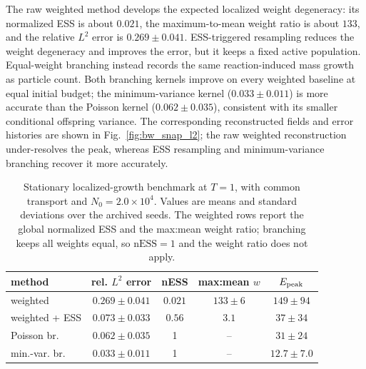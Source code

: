 \documentclass[a4paper,fleqn]{cas-sc}
\theoremstyle{definition}
\theoremstyle{remark}
\begin{document}
The raw weighted method develops the expected localized weight degeneracy: its normalized
ESS is about \(0.021\), the maximum-to-mean weight ratio is about \(133\), and the relative
\(L^2\) error is \(0.269\pm0.041\).  ESS-triggered resampling reduces the weight degeneracy
and improves the error, but it keeps a fixed active population.  Equal-weight branching
instead records the same reaction-induced mass growth as particle count.  Both branching
kernels improve on every weighted baseline at equal initial budget; the minimum-variance
kernel (\(0.033\pm0.011\)) is more accurate than the Poisson kernel (\(0.062\pm0.035\)),
consistent with its smaller conditional offspring variance.
The corresponding reconstructed
fields and error histories are shown in Fig.~\ref{fig:bw_snap_l2}; the raw weighted
reconstruction under-resolves the peak, whereas ESS resampling and minimum-variance
branching recover it more accurately.
\begin{table}[t]
\centering
\small
\caption{Stationary localized-growth benchmark at \(T=1\), with common transport and
\(N_0=2.0\times10^4\).  Values are means and standard deviations over the archived
seeds. %
The weighted rows report the global normalized ESS and the max:mean weight ratio;
branching keeps all weights equal, so \(\mathrm{nESS}=1\) and the weight ratio does not
apply.}
\label{tab:bw}
\begin{tabular}{l c c c c}
\toprule
method & rel. \(L^2\) error & nESS & max:mean \(w\) & \(E_{\rm peak}\) \\
\midrule
weighted        & \(0.269\pm0.041\)          & \(0.021\) & \(133\pm6\) & \(149\pm94\) \\
weighted + ESS  & \(0.073\pm0.033\)          & \(0.56\)  & \(3.1\)     & \(37\pm34\) \\
Poisson br.     & \(0.062\pm0.035\)          & 1         & --          & \(31\pm24\) \\
min.-var. br.   & \(\mathbf{0.033\pm0.011}\) & 1         & --          & \(\mathbf{12.7\pm7.0}\) \\
\bottomrule
\end{tabular}
\end{table}
 
\end{document}
